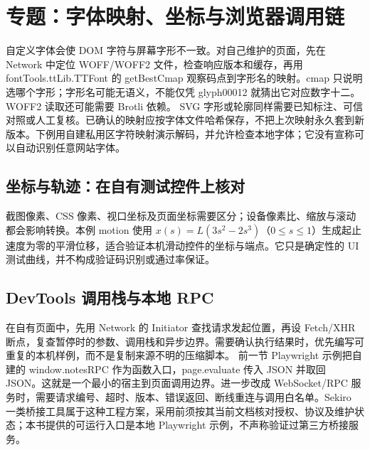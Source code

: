 \section{专题：字体映射、坐标与浏览器调用链}\label{rev:crawler:font}
自定义字体会使 DOM 字符与屏幕字形不一致。对自己维护的页面，先在 Network 中定位 WOFF/WOFF2 文件，检查响应版本和缓存，再用 fontTools.ttLib.TTFont 的 getBestCmap 观察码点到字形名的映射。cmap 只说明选哪个字形；字形名可能无语义，不能仅凭 glyph00012 就猜出它对应数字十二。WOFF2 读取还可能需要 Brotli 依赖。
SVG 字形或轮廓同样需要已知标注、可信对照或人工复核。已确认的映射应按字体文件哈希保存，不把上次映射永久套到新版本。下例用自建私用区字符映射演示解码，并允许检查本地字体；它没有宣称可以自动识别任意网站字体。

\subsection{坐标与轨迹：在自有测试控件上核对}
截图像素、CSS 像素、视口坐标及页面坐标需要区分；设备像素比、缩放与滚动都会影响转换。本例 motion 使用 $x(s)=L(3s^2-2s^3)$（$0\le s\le1$）生成起止速度为零的平滑位移，适合验证本机滑动控件的坐标与端点。它只是确定性的 UI 测试曲线，并不构成验证码识别或通过率保证。

\subsection{DevTools 调用栈与本地 RPC}
在自有页面中，先用 Network 的 Initiator 查找请求发起位置，再设 Fetch/XHR 断点，复查暂停时的参数、调用栈和异步边界。需要确认执行结果时，优先编写可重复的本机样例，而不是复制来源不明的压缩脚本。
前一节 Playwright 示例把自建的 window.notesRPC 作为函数入口，page.evaluate 传入 JSON 并取回 JSON。这就是一个最小的宿主到页面调用边界。进一步改成 WebSocket/RPC 服务时，需要请求编号、超时、版本、错误返回、断线重连与调用白名单。Sekiro 一类桥接工具属于这种工程方案，采用前须按其当前文档核对授权、协议及维护状态；本书提供的可运行入口是本地 Playwright 示例，不声称验证过第三方桥接服务。
